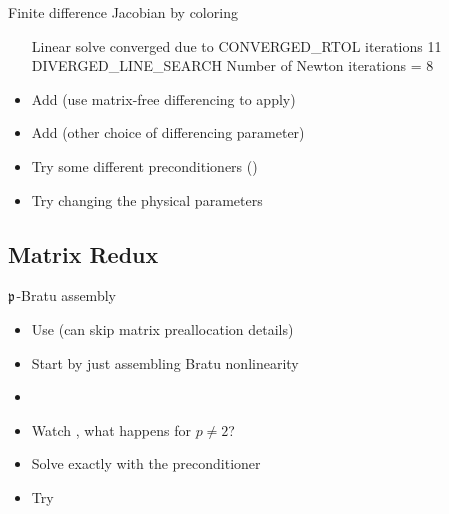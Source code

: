 \begin{frame}{Finite difference Jacobian by coloring}
\begin{itemize}
{{  Linear solve converged due to CONVERGED\_RTOL iterations 11\\
DIVERGED\_LINE\_SEARCH Number of Newton iterations = 8    
}}
  \item Add  (use matrix-free differencing to apply)
  \item Add  (other choice of differencing parameter)
  \item Try some different preconditioners ()
  \item Try changing the physical parameters
  \end{itemize}
\end{frame}

\subsection{Matrix Redux}








\begin{frame}{${\mathfrak p}$-Bratu assembly}
  \begin{itemize}
  \item Use  (can skip matrix preallocation details)
  \item Start by just assembling Bratu nonlinearity
  \item {}
  \item Watch , what happens for $p \ne 2$?
  \item Solve exactly with the preconditioner 
  \item Try 
  \end{itemize}
\end{frame}


